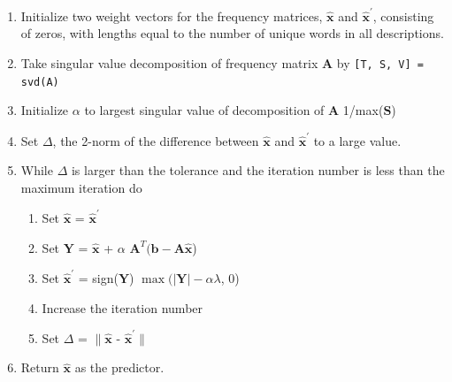 \documentclass[12pt]{article}
\begin{document}
        \begin{enumerate}
            
            \item Initialize two weight vectors for the frequency matrices,
                $\hat{\bm{x}}$ and $\hat{\bm{x}}^\prime$, consisting of zeros,
                with lengths equal to the number of unique words in all
                descriptions.

            \item Take singular value decomposition of frequency matrix
                $\bm{A}$ by \texttt{[T, S, V] = svd(A)}

            \item Initialize $\alpha$ to largest singular value of
                decomposition of $\bm{A}$ 1/max($\bm{S}$)

            \item Set $\Delta$, the 2-norm of the difference between
                $\hat{\bm{x}}$ and $\hat{\bm{x}}^\prime$ to a large value.
                
            \item While $\Delta$ is larger than the tolerance and the iteration
                number is less than the maximum iteration do

                \begin{enumerate}

                    \item Set $\hat{\bm{x}}$ = $\hat{\bm{x}}^\prime$
                    
                    \item Set $\bm{Y}$ = $\hat{\bm{x}}$ + $\alpha$ $\bm{A}^T
                        (\bm{b - A} \hat{\bm{x}}$)

                    \item Set $\hat{\bm{x}}^\prime$ = sign($\bm{Y}$)
                        $\max(|\bm{Y}| - \alpha \lambda$, 0)

                    \item Increase the iteration number

                    \item Set $\Delta$ = $\|\hat{\bm{x}}$ -
                        $\hat{\bm{x}}^\prime\|$

                \end{enumerate}

            \item Return $\hat{\bm{x}}$ as the predictor.

        \end{enumerate}
\end{document}
